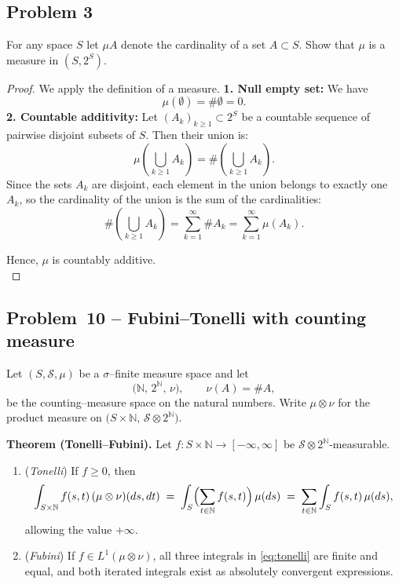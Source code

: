 \documentclass[11pt]{article}
\begin{document}
\subsection*{Problem 3}
For any space $S$ let $\mu A$ denote the cardinality of a set $A \subset S$. Show that $\mu$ is a measure in $(S, 2^S)$.
\begin{proof}
We apply the definition of a measure.
\textbf{1. Null empty set:}  
We have
\[
\mu(\emptyset) = \#\emptyset = 0.
\]
\textbf{2. Countable additivity:}  
Let \( (A_k)_{k \geq 1} \subset 2^S \) be a countable sequence of pairwise disjoint subsets of \( S \). Then their union is:
\[
\mu\left( \bigcup_{k \geq 1} A_k \right) = \#\left( \bigcup_{k \geq 1} A_k \right).
\]
Since the sets \( A_k \) are disjoint, each element in the union belongs to exactly one \( A_k \), so the cardinality of the union is the sum of the cardinalities:
\[
\#\left( \bigcup_{k \geq 1} A_k \right) = \sum_{k=1}^\infty \#A_k = \sum_{k=1}^\infty \mu(A_k).
\]

Hence, \( \mu \) is countably additive.  \\
\end{proof}


\subsection*{Problem 10 -- Fubini--Tonelli with counting measure}

Let $(S,\mathcal{S},\mu)$ be a $\sigma$--finite measure space and let
\[
\bigl(\mathbb{N},\,2^{\mathbb{N}},\,\nu\bigr), \qquad \nu(A)=\#A,
\]
be the counting--measure space on the natural numbers.
Write $\mu\otimes\nu$ for the product measure on
$\bigl(S\times\mathbb{N},\,\mathcal{S}\otimes 2^{\mathbb{N}}\bigr)$.

\medskip
\textbf{Theorem (Tonelli--Fubini).}\;
Let \(f:S\times\mathbb{N}\to[-\infty,\infty]\) be
\(\mathcal{S}\otimes 2^{\mathbb{N}}\)-measurable.

\begin{enumerate}[label=(\roman*)]
\item (\emph{Tonelli}) If \(f\ge 0\), then
\begin{equation}\label{eq:tonelli}
   \int_{S\times\mathbb{N}} f(s,t)\,(\mu\otimes\nu)(ds,dt)
   \;=\;
   \int_S \Bigl(\sum_{t\in\mathbb{N}} f(s,t)\Bigr)\,\mu(ds)
   \;=\;
   \sum_{t\in\mathbb{N}} \int_S f(s,t)\,\mu(ds),
\end{equation}
allowing the value \(+\infty\).

\item (\emph{Fubini}) If \(f\in L^{1}(\mu\otimes\nu)\),  
all three integrals in \eqref{eq:tonelli} are finite and equal, and both
iterated integrals exist as absolutely convergent expressions.
\end{enumerate}
\end{document}
